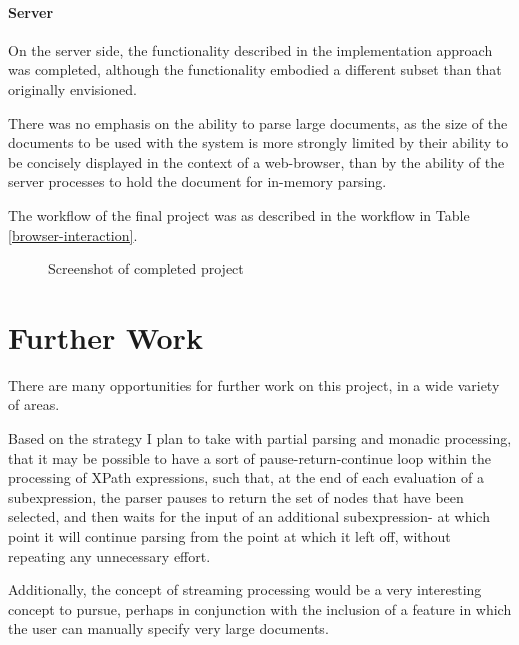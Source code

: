 \documentclass{acm_proc_article-sp}
\begin{document}
\paragraph{Server}
On the server side, the functionality described in the implementation approach was completed, although the functionality embodied a different subset than that originally envisioned.

There was no emphasis on the ability to parse large documents, as the size of the documents to be used with the system is more strongly limited by their ability to be concisely displayed in the context of a web-browser, than by the ability of the server processes to hold the document for in-memory parsing.

The workflow of the final project was as described in the workflow in Table \ref{browser-interaction}. 

\begin{figure}[!htpb]
\label{screenshot}
\centering
{}
\caption{Screenshot of completed project}
\end{figure}




\section{Further Work}

There are many opportunities for further work on this project, in a wide variety of areas.

Based on the strategy I plan to take with partial parsing and monadic processing, that it may be possible to have a sort of pause-return-continue loop within the processing of XPath expressions, such that, at the end of each evaluation of a subexpression, the parser pauses to return the set of nodes that have been selected, and then waits for the input of an additional subexpression- at which point it will continue parsing from the point at which it left off, without repeating any unnecessary effort. 

Additionally, the concept of streaming processing\cite{barton:streaming} would be a very interesting concept to pursue, perhaps in conjunction with the inclusion of a feature in which the user can manually specify very large documents. 
\end{document}
